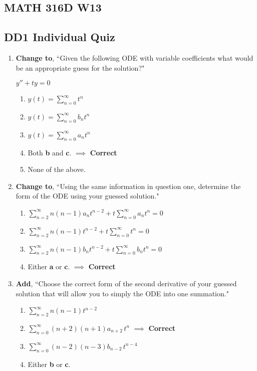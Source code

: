 \documentclass[11pt]{article}
\begin{document}
\begin{center}\section*{MATH 316D W13}\end{center}
\subsection*{DD1 Individual Quiz}

\begin{enumerate}
	\item \textbf{Change to}, ``Given the following ODE with variable coefficients what would be an appropriate guess for the solution?"
	
	\(y''+ty=0\)
		\begin{enumerate}
			\item \(y(t)=\sum_{n=0}^{\infty} t^{n}\)
			\item \(y(t)=\sum_{n=0}^{\infty} b_{n}t^{n}\)
			\item \(y(t)=\sum_{n=0}^{\infty} a_{n}t^{n}\)
			\item Both \textbf{\textup{b}} and \textbf{\textup{c}}. $\implies$ \textbf{Correct}
			\item None of the above.
		\end{enumerate}
		
	\item \textbf{Change to}, ``Using the same information in question one, determine the form of the ODE using your guessed solution."
	
		\begin{enumerate}
			\item \(\sum_{n=2}^{\infty} n(n-1)a_{n}t^{n-2}+t\sum_{n=0}^{\infty}a_{n}t^{n}=0\)
			\item \(\sum_{n=2}^{\infty} n(n-1)t^{n-2}+t\sum_{n=0}^{\infty}t^{n}=0\)
			\item \(\sum_{n=2}^{\infty} n(n-1)b_{n}t^{n-2}+t\sum_{n=0}^{\infty}b_{n}t^{n}=0\)
			\item Either \textbf{\textup{a}} or \textbf{\textup{c}}. $\implies$ \textbf{Correct}
		\end{enumerate}
		
	\item \textbf{Add}, ``Choose the correct form of the second derivative of your guessed solution that will allow you to simply the ODE into one summation."
	
		\begin{enumerate}
			\item \(\sum_{n=2}^{\infty} n(n-1)t^{n-2}\)
			\item \(\sum_{n=0}^{\infty} (n+2)(n+1)a_{n+2}\, t^{n}\) $\implies$ \textbf{Correct}
			\item \(\sum_{n=0}^{\infty} (n-2)(n-3)b_{n-2}\, t^{n-4}\)
			\item Either \textbf{\textup{b}} or \textbf{\textup{c}}.
		\end{enumerate}
		

\end{enumerate}
\end{document}
